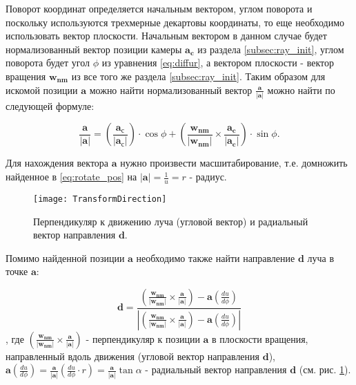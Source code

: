 Поворот координат определяется начальным вектором, углом поворота и поскольку используются трехмерные декартовы координаты, то еще необходимо использовать вектор плоскости. Начальным вектором в данном случае будет нормализованный вектор позиции камеры $\mathbf{a_c}$ из раздела \ref{subsec:ray_init}, углом поворота будет угол $\phi$ из уравнения \eqref{eq:diffur}, а вектором плоскости - вектор вращения $\mathbf{w_{nm}}$ из все того же раздела \ref{subsec:ray_init}. Таким образом для искомой позиции $\mathbf{a}$ можно найти нормализованный вектор $\frac{\mathbf{a}}{\left|\mathbf{a}\right|}$ можно найти по следующей формуле:

\begin{equation}
\label{eq:rotate_pos}
    \frac{\mathbf{a}}{\left|\mathbf{a}\right|} = \left( \frac{\mathbf{a_{с}}}{\left|\mathbf{a_{с}}\right|} \right) \cdot \cos{\phi} + \left(\frac{\mathbf{w_{nm}}}{\left|\mathbf{w_{nm}}\right|} \times \frac{\mathbf{a_c}}{\left|\mathbf{a_c}\right|} \right) \cdot \sin{\phi}.
\end{equation}

Для нахождения вектора $\mathbf{a}$ нужно произвести масшитабирование, т.е. домножить найденное в \eqref{eq:rotate_pos} на $\left|\mathbf{a}\right| = \frac{1}{u} = r$ - радиус.

\begin{figure}[h]
    \centering
    \texttt{[image: TransformDirection]}
    \caption{Перпендикуляр к движению луча (угловой вектор) и радиальный вектор направления $\mathbf{d}$.}
    \label{fig:transform_direction}
\end{figure}

Помимо найденной позиции $\mathbf{a}$ необходимо также найти направление $\mathbf{d}$ луча в точке $\mathbf{a}$:

\begin{equation}
\label{eq:rotate_dir}
    \mathbf{d} = \frac{\left(\frac{\mathbf{w_{nm}}}{\left|\mathbf{w_{nm}}\right|} \times \frac{\mathbf{a}}{\left|\mathbf{a}\right|}\right) - \mathbf{a}\left(\frac{du}{d\phi}\right)}{\left| \left(\frac{\mathbf{w_{nm}}}{\left|\mathbf{w_{nm}}\right|} \times \frac{\mathbf{a}}{\left|\mathbf{a}\right|}\right) - \mathbf{a}\left(\frac{du}{d\phi}\right) \right|}
\end{equation}
, где $\left(\frac{\mathbf{w_{nm}}}{\left|\mathbf{w_{nm}}\right|} \times \frac{\mathbf{a}}{\left|\mathbf{a}\right|}\right)$ - перпендикуляр к позиции $\mathbf{a}$ в плоскости вращения, направленный вдоль движения (угловой вектор направления $\mathbf{d}$), $\mathbf{a}\left(\frac{du}{d\phi}\right) = \frac{\mathbf{a}}{\left|\mathbf{a}\right|}\left(\frac{du}{d\phi} \cdot r\right) = \frac{\mathbf{a}}{\left|\mathbf{a}\right|} \tan{\alpha}$ - радиальный вектор направления $\mathbf{d}$ (см. рис. \ref{fig:transform_direction}). 

